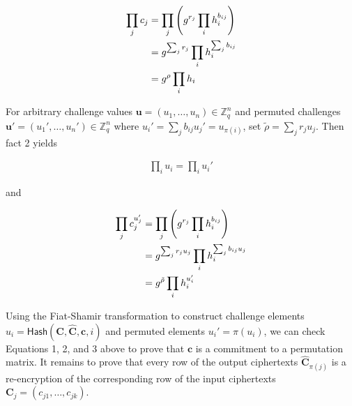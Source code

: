 \documentclass[12pt,a4paper]{article}
\theoremstyle{definition}
\begin{document}
\begin{align}
\prod_j c_j &= \prod_j \left(g^{r_j}\prod_i h_i^{b_{ij}}\right)\notag\\
            &= g^{\sum_j r_j}\prod_i h_i^{\sum_j b_{ij}}\notag\\
            &= g^\rho\prod_i h_i \label{wikstrom-1}
\end{align}

For arbitrary challenge values $\mathbf{u}=(u_1, \ldots, u_n)\in\mathbb{Z}_q^n$ and permuted challenges $\mathbf{u'}=(u_1',\ldots,u_n')\in\mathbb{Z}_q^n$ where $u_i' = \sum_j b_{ij} u_j' = u_{\pi(i)}$, set $\tilde{\rho}=\sum_j r_j u_j$. Then fact 2 yields

\begin{align}
    \prod_i u_i = \prod_i u_i' \label{wikstrom-2}
\end{align}

and

\begin{align}
    \prod_j c_j^{u_j'}   &= \prod_j\left(g^{r_j}\prod_i h_i^{b_{ij}}\right)\notag\\    
                        &= g^{\sum_j r_j u_j}\prod_i h_i^{\sum_j b_{ij} u_j}\notag\\
                        &= g^{\tilde{\rho}} \prod_i h_i^{u_i'} \label{wikstrom-3}
\end{align}

Using the Fiat-Shamir transformation to construct challenge elements \\ $u_i=\mathsf{Hash}(\mathbf{C}, \mathbf{\hat{C}}, \mathbf{c}, i)$ and permuted elements $u_i'=\pi(u_i)$, we can check Equations 1, 2, and 3 above to prove that $\mathbf{c}$ is a commitment to a permutation matrix. It remains to prove that every row of the output ciphertexts $\mathbf{\hat{C}}_{\pi(j)}$ is a re-encryption of the corresponding row of the input ciphertexts $\mathbf{C}_j=(c_{j1},\ldots,c_{jk})$.
\end{document}
